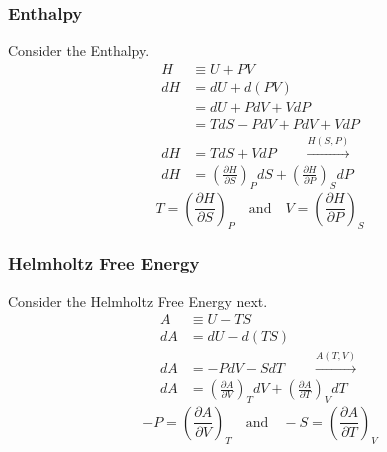 \documentclass{article}
\begin{document}
\subsubsection*{Enthalpy}
Consider the Enthalpy.
\begin{equation}
    \begin{split}
    H &\equiv U + PV \\
     dH &= dU + d(PV) \\
         &= dU +PdV + VdP\\
         &= TdS - PdV + PdV + VdP\\
        dH &= TdS + VdP  \qquad \xrightarrow{H(S,P)} \\
        dH &= \left(\frac{\partial H}{\partial S}\right)_P dS + \left(\frac{\partial H}{\partial P}\right)_S dP
    \end{split}
\end{equation}
\begin{equation*}
     T= \left(\frac{\partial H}{\partial S}\right)_P \quad \text{and} \quad  V= \left(\frac{\partial H}{\partial P}\right)_S
\end{equation*}

\subsubsection*{Helmholtz Free Energy}
Consider the Helmholtz Free Energy next. 
\begin{equation}
    \begin{split}
    A &\equiv U - TS \\
        dA &= dU - d(TS) \\
          dA &= -PdV - SdT \qquad \xrightarrow{A(T,V)} \\
        dA &= \left(\frac{\partial A}{\partial V}\right)_T dV + \left(\frac{\partial A}{\partial T}\right)_V dT
    \end{split}
\end{equation}
\begin{equation*}
    -P = \left(\frac{\partial A}{\partial V}\right)_T \quad \text{and} \quad  -S= \left(\frac{\partial A}{\partial T}\right)_V
\end{equation*}
\end{document}
